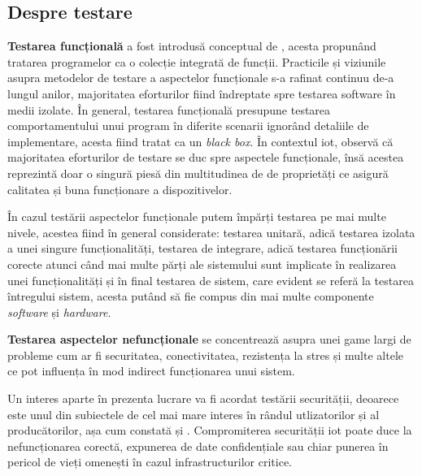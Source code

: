
\subsection*{Despre testare}


\textbf{Testarea funcțională} a fost introdusă conceptual de \cite{Howden1980}, acesta propunând tratarea programelor ca o colecție integrată de funcții. Practicile și viziunile asupra metodelor de testare a aspectelor funcționale s-a rafinat continuu de-a lungul anilor, majoritatea eforturilor fiind îndreptate spre testarea software în medii izolate. În general, testarea funcțională presupune testarea comportamentului unui program în diferite scenarii ignorând detaliile de implementare, acesta fiind tratat ca un \textit{black box}. În contextul \acrshort{iot}, \cite{Corts2019} observă că majoritatea eforturilor de testare se duc spre aspectele funcționale, însă acestea reprezintă doar o singură piesă din multitudinea de de proprietăți ce asigură calitatea și buna funcționare a dispozitivelor.

În cazul testării aspectelor funcționale putem împărți testarea pe mai multe nivele, acestea fiind în general considerate: testarea unitară, adică testarea izolata a unei singure funcționalități, testarea de integrare, adică testarea funcționării corecte atunci când mai multe părți ale sistemului sunt implicate în realizarea unei funcționalități și în final testarea de sistem, care evident se referă la testarea întregului sistem, acesta putând să fie compus din mai multe componente \textit{software} și \textit{hardware}.

\textbf{Testarea aspectelor nefuncționale} se concentrează asupra unei game largi de probleme cum ar fi securitatea, conectivitatea, rezistența la stres și multe altele ce pot influența în mod indirect funcționarea unui sistem.


Un interes aparte în prezenta lucrare va fi acordat testării securității, deoarece este unul din subiectele de cel mai mare interes în rândul utlizatorilor și al producătorilor, așa cum constată \cite{Ahmed2019} și \cite{Lee2015}. Compromiterea securității \acrshort{iot} poate duce la nefuncționarea corectă, expunerea de date confidențiale sau chiar punerea în pericol de vieți omenești în cazul infrastructurilor critice.

